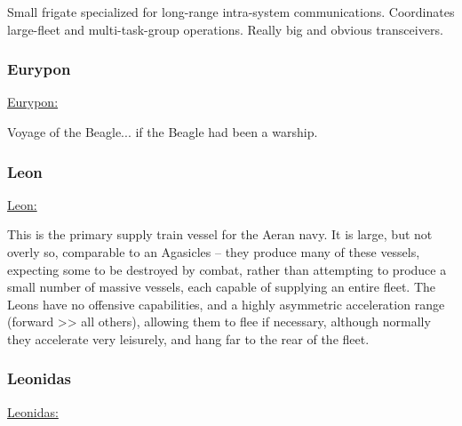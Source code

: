 Small frigate specialized for long-range intra-system
communications. Coordinates large-fleet and multi-task-group
operations. Really big and obvious transceivers.



\subsubsection{Eurypon}
\href{http://vegastrike.sourceforge.net/wiki/Vessel:Eurypon}{Eurypon:}

Voyage of the Beagle... if the Beagle had been a warship.


\subsubsection{Leon}
\href{http://vegastrike.sourceforge.net/wiki/Vessel:Leon}{Leon:}

This is the primary supply train vessel for the Aeran navy. It is
large, but not overly so, comparable to an Agasicles -- they produce
many of these vessels, expecting some to be destroyed by combat,
rather than attempting to produce a small number of massive vessels,
each capable of supplying an entire fleet. The Leons have no offensive
capabilities, and a highly asymmetric acceleration range (forward >>
all others), allowing them to flee if necessary, although normally
they accelerate very leisurely, and hang far to the rear of the fleet.

\subsubsection{Leonidas}

\href{http://vegastrike.sourceforge.net/wiki/Vessel:Leonidas}{Leonidas:}


